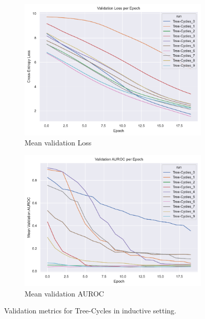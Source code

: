 \begin{figure}[htbp]
    \centering
    \begin{subfigure}[b]{0.48\textwidth}
        \centering
        \includegraphics[width=\textwidth]{img/plots/val_loss_plot.pdf}
        \caption{Mean validation Loss}
        \label{fig:Tree-Cycles-val_loss}
    \end{subfigure}
    \hfill
    \begin{subfigure}[b]{0.48\textwidth}
        \centering
        \includegraphics[width=\textwidth]{img/plots/val_auroc_plot.pdf}
        \caption{Mean validation AUROC}
        \label{fig:Tree-Cycles-val_auroc}
    \end{subfigure}
    \caption[Validation metrics for Tree-Cycles]{Validation metrics for Tree-Cycles in inductive setting.}
    \label{fig:Tree-Cycles-val_metrics}
\end{figure}

